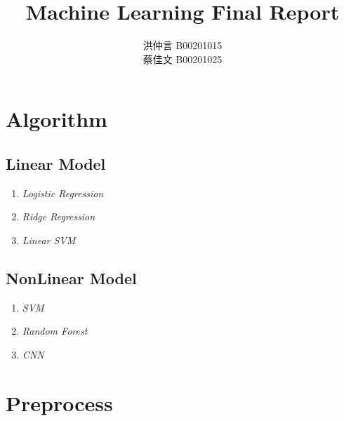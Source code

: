 \documentclass[12pt]{article}
\theoremstyle{definition}
\theoremstyle{remark}
\begin{document}

\title{Machine Learning Final Report}
\author{洪仲言 B00201015\\
蔡佳文 B00201025}
\maketitle
\section{Algorithm}
\subsection{Linear Model}
\begin{enumerate}
  \item {\em Logistic Regression\/}
  \item {\em Ridge Regression\/}
  \item {\em Linear SVM\/}
\end{enumerate}
\subsection{NonLinear Model}
\begin{enumerate}
  \item {\em SVM\/}
  \item {\em Random Forest\/}
  \item {\em CNN\/}
\end{enumerate}
\section{Preprocess}
\end{document}
